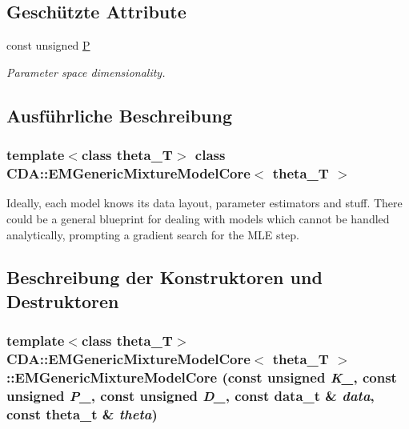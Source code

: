 \subsection*{Geschützte Attribute}
\begin{DoxyCompactItemize}
\item 
const unsigned \hyperlink{classCDA_1_1EMGenericMixtureModelCore_ac31ee51281c9984de28e57351758a1a4}{P}
\begin{DoxyCompactList}\small\item\em Parameter space dimensionality. \item\end{DoxyCompactList}\end{DoxyCompactItemize}


\subsection{Ausführliche Beschreibung}
\subsubsection*{template$<$class theta\_\-T$>$ class CDA::EMGenericMixtureModelCore$<$ theta\_\-T $>$}

Ideally, each model knows its data layout, parameter estimators and stuff. There could be a general blueprint for dealing with models which cannot be handled analytically, prompting a gradient search for the MLE step. 

\subsection{Beschreibung der Konstruktoren und Destruktoren}
\hypertarget{classCDA_1_1EMGenericMixtureModelCore_a859924898febe8bae4a8ce2c4aebdeab}{
\subsubsection[{EMGenericMixtureModelCore}]{\setlength{\rightskip}{0pt plus 5cm}template$<$class theta\_\-T$>$ {\bf CDA::EMGenericMixtureModelCore}$<$ theta\_\-T $>$::{\bf EMGenericMixtureModelCore} (const unsigned {\em K\_\-}, \/  const unsigned {\em P\_\-}, \/  const unsigned {\em D\_\-}, \/  const {\bf data\_\-t} \& {\em data}, \/  const theta\_\-t \& {\em theta})}}
\label{classCDA_1_1EMGenericMixtureModelCore_a859924898febe8bae4a8ce2c4aebdeab}


